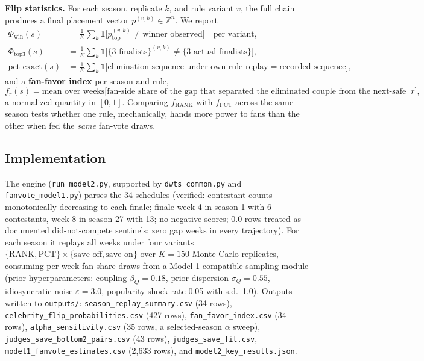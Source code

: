 \documentclass[11pt]{article}
\begin{document}
\textbf{Flip statistics.} For each season, replicate $k$, and rule variant $v$, the full
chain produces a final placement vector $p^{(v,k)} \in \mathbb{Z}^{n}$. We report
\begin{align}
  \Phi_{\text{win}}(s) &= \tfrac{1}{K}\textstyle\sum_k \mathbf{1}\bigl[p^{(v,k)}_{\text{top}}
  \neq \text{winner observed}\bigr] \quad \text{per variant}, \\
  \Phi_{\text{top3}}(s) &= \tfrac{1}{K}\textstyle\sum_k
  \mathbf{1}\bigl[\{3\text{ finalists}\}^{(v,k)} \neq \{3\text{ actual finalists}\}\bigr], \\
  \text{pct\_exact}(s) &= \tfrac{1}{K}\textstyle\sum_k \mathbf{1}\bigl[\text{elimination
  sequence under own-rule replay} = \text{recorded sequence}\bigr],
\end{align}
and a \textbf{fan-favor index} per season and rule,
\begin{equation}
  f_r(s) = \text{mean over weeks} \bigl[ \text{fan-side share of the gap that separated
  the eliminated couple from the next-safe couple under rule } r \bigr],
  \label{eq:fanfavor}
\end{equation}
a normalized quantity in $[0,1]$. Comparing $f_{\text{RANK}}$ with
$f_{\text{PCT}}$ across the same season tests whether one rule, mechanically, hands
more power to fans than the other when fed the \emph{same} fan-vote draws.

\subsection{Implementation}

The engine (\texttt{run\_model2.py}, supported by \texttt{dwts\_common.py} and
\texttt{fanvote\_model1.py}) parses the 34 schedules (verified: contestant counts
monotonically decreasing to each finale; finale week 4 in season 1 with 6 contestants,
week 8 in season 27 with 13; no negative scores; 0.0 rows treated as documented
did-not-compete sentinels; zero gap weeks in every trajectory). For each season it
replays all weeks under four variants $\{\text{RANK}, \text{PCT}\} \times \{\text{save
off}, \text{save on}\}$ over $K = 150$ Monte-Carlo replicates, consuming per-week
fan-share draws from a Model-1-compatible sampling module (prior hyperparameters:
coupling $\beta_Q = 0.18$, prior dispersion $\sigma_Q = 0.55$, idiosyncratic noise
$\varepsilon = 3.0$, popularity-shock rate 0.05 with s.d.\ 1.0). Outputs written to
\texttt{outputs/}: \texttt{season\_replay\_summary.csv} (34 rows),
\texttt{celebrity\_flip\_probabilities.csv} (427 rows), \texttt{fan\_favor\_index.csv}
(34 rows), \texttt{alpha\_sensitivity.csv} (35 rows, a selected-season $\alpha$ sweep),
\texttt{judges\_save\_bottom2\_pairs.csv} (43 rows), \texttt{judges\_save\_fit.csv},
\texttt{model1\_fanvote\_estimates.csv} (2{,}633 rows), and
\texttt{model2\_key\_results.json}.
\end{document}
